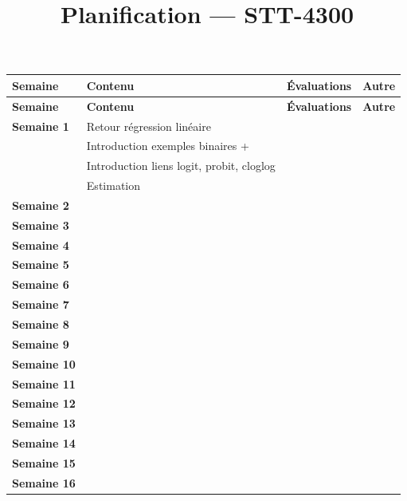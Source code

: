 \documentclass[11pt,letterpaper]{article}
\title{\textbf{Planification --- STT-4300}}
\date{}
\begin{document}
\maketitle

\vspace{-2cm}
\begin{longtable}{>{\bfseries}p{2.5cm} p{8cm} p{3cm} p{4cm}}
\toprule
\textbf{Semaine} & \textbf{Contenu} & \textbf{Évaluations} & \textbf{Autre} \\
\midrule
\endfirsthead
\toprule
\textbf{Semaine} & \textbf{Contenu} & \textbf{Évaluations} & \textbf{Autre} \\
\midrule
\endhead
\bottomrule
\endfoot
Semaine 1  & Retour régression linéaire & & \\[1ex]
           & Introduction exemples binaires +  & & \\[1ex]
           & Introduction liens logit, probit, cloglog & & \\[1ex]
           & Estimation & & \\[1ex]
Semaine 2  & & & \\[1ex]
Semaine 3  & & & \\[1ex]
Semaine 4  & & & \\[1ex]
Semaine 5  & & & \\[1ex]
Semaine 6  & & & \\[1ex]
Semaine 7  & & & \\[1ex]
Semaine 8  & & & \\[1ex]
Semaine 9  & & & \\[1ex]
Semaine 10 & & & \\[1ex]
Semaine 11 & & & \\[1ex]
Semaine 12 & & & \\[1ex]
Semaine 13 & & & \\[1ex]
Semaine 14 & & & \\[1ex]
Semaine 15 & & & \\[1ex]
Semaine 16 & & & \\[1ex]
\end{longtable}
\end{document}
